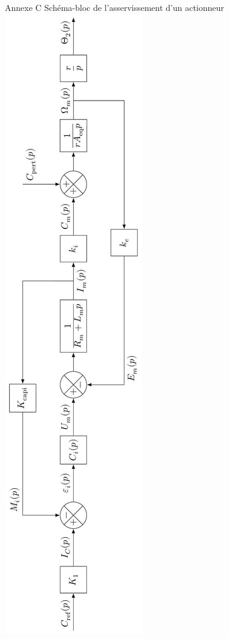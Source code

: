 \documentclass[10pt]{article}
\begin{document}
Annexe C Schéma-bloc de l'asservissement d'un actionneur\\
\includegraphics[max width=\textwidth, center]{2025_07_03_97545f5dc188959e5663g-14}
\end{document}
